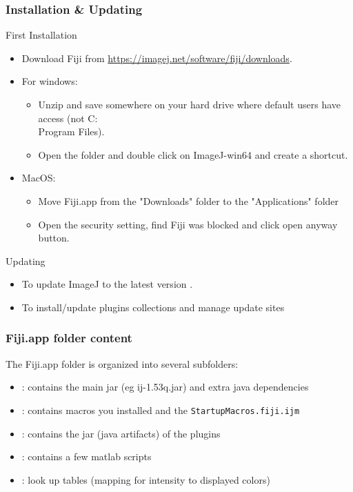 \documentclass[ignorenonframetext,aspectratio=169,10pt,xcolor=table]{beamer}
\begin{document}
\begin{frame} \frametitle{Installation \& Updating}

  \begin{block}{First Installation}
    \begin{itemize}
    \item Download Fiji from  \url{https://imagej.net/software/fiji/downloads}.
    \item For windows:
    \begin{itemize}
      \item Unzip and save somewhere on your hard drive where default
      users have access (not C:\\Program Files).
      \item Open the folder and double click on ImageJ-win64
      and create a shortcut.
    \end{itemize}
    \item MacOS: 
    \begin{itemize}
      \item Move Fiji.app from the "Downloads" folder to the "Applications" folder
     \item Open the security setting, find Fiji was blocked and click open anyway button.
    \end{itemize}
    \end{itemize}
  \end{block}

  \begin{block}{Updating}
    \begin{itemize}
    \item To update ImageJ to the latest version .
    \item To install/update plugins collections and manage update
      sites 
    \end{itemize}
  \end{block}

\end{frame}

\begin{frame}  \frametitle{Fiji.app folder content}

  The Fiji.app folder is organized into several subfolders:

  \begin{itemize} \setlength\itemsep{1em}
  \item {}: contains the main jar (eg ij-1.53q.jar) and
    extra java dependencies
  \item {}: contains macros you installed and the
    \texttt{StartupMacros.fiji.ijm}
  \item {}: contains the jar (java artifacts) of the
    plugins
  \item {}: contains a few matlab scripts
  \item {}: look up tables (mapping for intensity to displayed
    colors)
  \end{itemize}

\end{frame}
\end{document}
